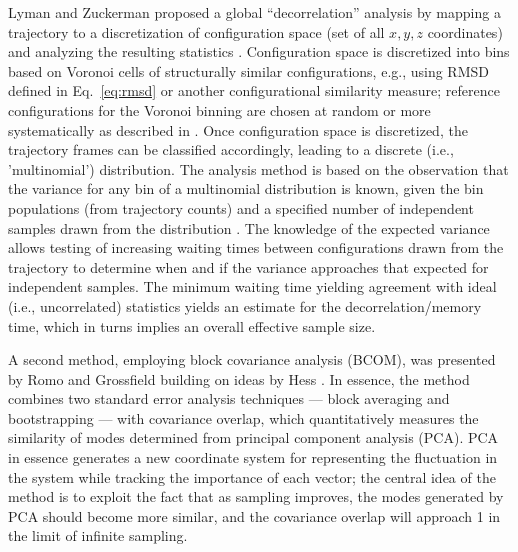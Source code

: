 Lyman and Zuckerman proposed a global ``decorrelation'' analysis by mapping a trajectory to a discretization of configuration space (set of all $x, y, z$ coordinates) and analyzing the resulting statistics \cite{Lyman2007a}.
Configuration space is discretized into bins based on Voronoi cells of structurally similar configurations,  e.g., using RMSD defined in Eq.\ \eqref{eq:rmsd} or another configurational similarity measure; reference configurations for the Voronoi binning are chosen at random or more systematically as described in \cite{Lyman2007a}.
Once configuration space is discretized, the trajectory frames can be classified accordingly, leading to a discrete (i.e., 'multinomial') distribution.
The analysis method is based on the observation that the variance for any bin of a multinomial distribution is known, given the bin populations (from trajectory counts) and a specified number of independent samples drawn from the distribution \cite{Lyman2007a}.
The knowledge of the expected variance allows testing of increasing waiting times between configurations drawn from the trajectory to determine when and if the variance approaches that expected for independent samples.
The minimum waiting time yielding agreement with ideal (i.e., uncorrelated) statistics yields an estimate for the decorrelation/memory time, which in turns implies an overall effective sample size. 



A second method, employing block covariance analysis (BCOM), was presented by Romo and Grossfield \cite{Romo2011} building on ideas by Hess \cite{Hess2002}.  In essence, the method combines two standard error analysis techniques --- block averaging \cite{Flyvbjerg-1989} and bootstrapping \cite{Tibshirani1998} --- with covariance overlap, which quantitatively measures the similarity of modes determined from principal component analysis (PCA)\cite{Hess2002}.  PCA in essence generates a new coordinate system for representing the fluctuation in the system while tracking the importance of each vector; the central idea of the method is to exploit the fact that as sampling improves, the modes generated by PCA should become more similar, and the covariance overlap will approach 1 in the limit of infinite sampling.


